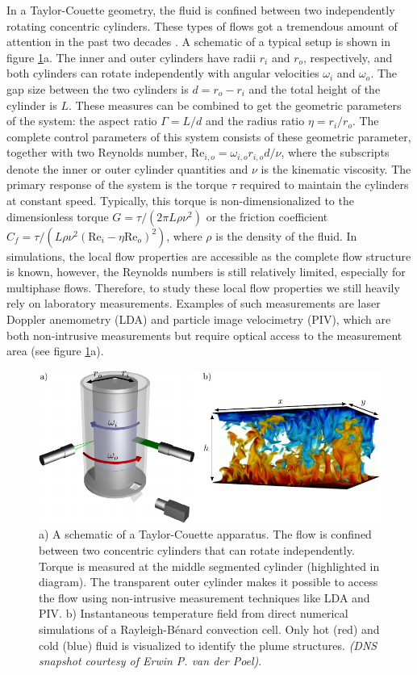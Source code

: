 In a Taylor-Couette geometry, the fluid is confined between two independently
rotating concentric cylinders. These types of flows got a tremendous amount of
attention in the past two decades \citep{Grossmann2016}. A schematic
of a typical setup is shown in figure \ref{fig:intro_setup}a. The inner and
outer cylinders have radii $r_i$ and $r_o$, respectively, and both cylinders
can rotate independently with angular velocities $\omega_i$ and $\omega_o$.
The gap size between the two cylinders is $d=r_o-r_i$ and the total height of
the cylinder is $L$. These measures can be combined to get the geometric
parameters of the system: the aspect ratio $\Gamma=L/d$ and the radius ratio
$\eta=r_i/r_o$.  The complete control parameters of this system consists of
these geometric parameter, together with two Reynolds number,
$\text{Re}_{i,o}=\omega_{i,o} r_{i,o} d / \nu$, where the subscripts denote
the inner or outer cylinder quantities and $\nu$ is the kinematic viscosity.
The primary response of the system is the torque $\tau$ required to maintain
the cylinders at constant speed. Typically, this torque is non-dimensionalized
to the dimensionless torque $G=\tau / (2 \pi L \rho \nu^2)$ or the friction
coefficient $C_f=\tau / (L\rho\nu^2(\text{Re}_i - \eta\text{Re}_o)^2)$, where
$\rho$ is the density of the fluid. In simulations, the local flow properties
are accessible as the complete flow structure is known, however, the Reynolds
numbers is still relatively limited, especially for multiphase flows.
Therefore, to study these local flow properties we still heavily rely on
laboratory measurements. Examples of such measurements are laser Doppler
anemometry (LDA) and particle image velocimetry (PIV), which are both
non-intrusive measurements but require optical access to the measurement area
(see figure \ref{fig:intro_setup}a).

\begin{figure}[ht]
    \centering
    \includegraphics[width=1.0\linewidth]{fig/setup/setup.pdf}
    \caption{a) A schematic of a Taylor-Couette apparatus. The
    flow is confined between two concentric cylinders that can rotate
    independently. Torque is measured at the middle segmented cylinder
    (highlighted in diagram). The transparent outer cylinder makes it possible
    to access the flow using non-intrusive measurement techniques like LDA and PIV. b)
    Instantaneous temperature field from direct numerical simulations of a
    Rayleigh-B\'enard convection cell. Only hot (red) and cold (blue) fluid is
    visualized to identify the plume structures. \textit{(DNS snapshot courtesy
    of Erwin P. van der Poel)}.}
    \label{fig:intro_setup}
\end{figure}

